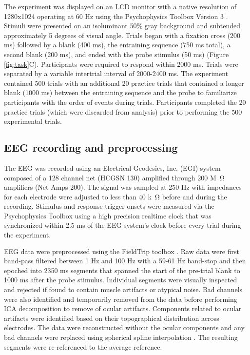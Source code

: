 \documentclass[dwyatte_dissertation.tex]{subfiles}
\begin{document}
The experiment was displayed on an LCD monitor with a native resolution of 1280x1024 operating at 60 Hz using the Psychophysics Toolbox Version 3 \cite{Brainard97,Pelli97}. Stimuli were presented on an isoluminant 50\% gray background and subtended approximately 5 degrees of visual angle. Trials began with a fixation cross (200 ms) followed by a blank (400 ms), the entraining sequence (750 ms total), a second blank (200 ms), and ended with the probe stimulus (50 ms) (Figure \ref{fig:task}C). Participants were required to respond within 2000 ms. Trials were separated by a variable intertrial interval of 2000-2400 ms. The experiment contained 500 trials with an additional 20 practice trials that contained a longer blank (1000 ms) between the entraining sequence and the probe to familiarize participants with the order of events during trials. Participants completed the 20 practice trials (which were discarded from analysis) prior to performing the 500 experimental trials. %

\subsection{EEG recording and preprocessing}
The EEG was recorded using an Electrical Geodesics, Inc. (EGI) system composed of a 128 channel net (HCGSN 130) amplified through 200 M\SI{}{\ohm} amplifiers (Net Amps 200). The signal was sampled at 250 Hz with impedances for each electrode were adjusted to less than 40 k\SI{}{\ohm} before and during the recording. Stimulus and response trigger onsets were measured via the Psychophysics Toolbox using a high precision realtime clock that was synchronized within 2.5 ms of the EEG system's clock before every trial during the experiment.

EEG data were preprocessed using the FieldTrip toolbox \cite{OostenveldFriesMarisEtAl11}. Raw data were first band-pass filtered between 1 Hz and 100 Hz with a 59-61 Hz band-stop and then epoched into 2350 ms segments that spanned the start of the pre-trial blank to 1000 ms after the probe stimulus. Individual segments were visually inspected and rejected if found to contain muscle artifacts or atypical noise. Bad channels were also identified and temporarily removed from the data before performing ICA decomposition \cite{DelormeMakeig04} to remove of ocular artifacts. Components related to ocular artifacts were identified based on their topographical distribution across electrodes. The data were reconstructed without the ocular components and any bad channels were replaced using spherical spline interpolation \cite{PerrinPernierBertrandEtAl89}. The resulting segments were re-referenced to the average reference.
\end{document}
